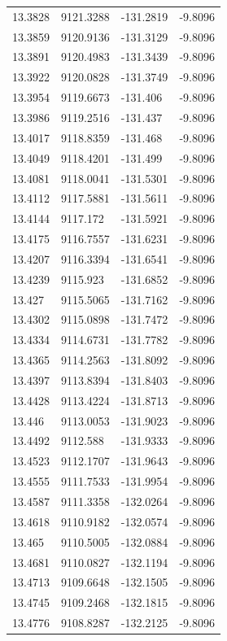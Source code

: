 \begin{table}[H]
\begin{tabular}{llll}
13.3828 & 9121.3288 & -131.2819 & -9.8096 \\
13.3859 & 9120.9136 & -131.3129 & -9.8096 \\
13.3891 & 9120.4983 & -131.3439 & -9.8096 \\
13.3922 & 9120.0828 & -131.3749 & -9.8096 \\
13.3954 & 9119.6673 & -131.406 & -9.8096 \\
13.3986 & 9119.2516 & -131.437 & -9.8096 \\
13.4017 & 9118.8359 & -131.468 & -9.8096 \\
13.4049 & 9118.4201 & -131.499 & -9.8096 \\
13.4081 & 9118.0041 & -131.5301 & -9.8096 \\
13.4112 & 9117.5881 & -131.5611 & -9.8096 \\
13.4144 & 9117.172 & -131.5921 & -9.8096 \\
13.4175 & 9116.7557 & -131.6231 & -9.8096 \\
13.4207 & 9116.3394 & -131.6541 & -9.8096 \\
13.4239 & 9115.923 & -131.6852 & -9.8096 \\
13.427 & 9115.5065 & -131.7162 & -9.8096 \\
13.4302 & 9115.0898 & -131.7472 & -9.8096 \\
13.4334 & 9114.6731 & -131.7782 & -9.8096 \\
13.4365 & 9114.2563 & -131.8092 & -9.8096 \\
13.4397 & 9113.8394 & -131.8403 & -9.8096 \\
13.4428 & 9113.4224 & -131.8713 & -9.8096 \\
13.446 & 9113.0053 & -131.9023 & -9.8096 \\
13.4492 & 9112.588 & -131.9333 & -9.8096 \\
13.4523 & 9112.1707 & -131.9643 & -9.8096 \\
13.4555 & 9111.7533 & -131.9954 & -9.8096 \\
13.4587 & 9111.3358 & -132.0264 & -9.8096 \\
13.4618 & 9110.9182 & -132.0574 & -9.8096 \\
13.465 & 9110.5005 & -132.0884 & -9.8096 \\
13.4681 & 9110.0827 & -132.1194 & -9.8096 \\
13.4713 & 9109.6648 & -132.1505 & -9.8096 \\
13.4745 & 9109.2468 & -132.1815 & -9.8096 \\
13.4776 & 9108.8287 & -132.2125 & -9.8096 \\

\end{tabular}
\end{table}
